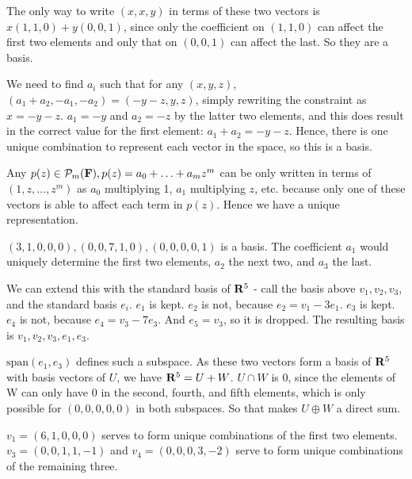 \documentclass{article}
\begin{document}

The only way to write $(x,x,y)$ in terms of these two vectors is $x(1,1,0) +
y(0,0,1)$, since only the coefficient on $(1,1,0)$ can affect the first two
elements and only that on $(0,0,1)$ can affect the last. So they are a basis.


We need to find $a_i$ such that for any $(x, y, z)$, $(a_1 + a_2, -a_1, -a_2) =
(-y-z, y, z)$, simply rewriting the constraint as $x = -y - z$. $a_1 = -y$ and
$a_2 = -z$ by the latter two elements, and this does result in the correct value
for the first element: $a_1 + a_2 = -y - z$. Hence, there is one unique
combination to represent each vector in the space, so this is a basis.


Any $p(z) \in \mathcal{P}_m(\mathbf{F}), p(z) = a_0 + \ldots + a_mz^m$ can be only
written in terms of $(1, z, \ldots, z^m)$ as $a_0$ multiplying 1, $a_1$
multiplying $z$, etc. because only one of these vectors is able to affect each
term in $p(z)$. Hence we have a unique representation.


$(3,1,0,0,0), (0,0,7,1,0), (0,0,0,0,1)$ is a basis. The coefficient $a_1$ would
uniquely determine the first two elements, $a_2$ the next two, and $a_3$ the
last.


We can extend this with the standard basis of $\mathbf{R}^5$ - call the basis above
$v_1, v_2, v_3$, and the standard basis $e_i$. $e_1$ is kept. $e_2$ is not,
because $e_2 = v_1 - 3e_1$. $e_3$ is kept. $e_4$ is not, because $e_4 = v_3 -
7e_3$. And $e_5 = v_3$, so it is dropped. The resulting basis is $v_1, v_2, v_3,
e_1, e_3$.


$\text{span}(e_1, e_3)$ defines such a subspace. As these two vectors form a
basis of $\mathbf{R}^5$ with basis vectors of $U$, we have $\mathbf{R}^5 = U + W$. $U
\cap W$ is 0, since the elements of W can only have 0 in the second, fourth,
and fifth elements, which is only possible for $(0,0,0,0,0)$ in both subspaces.
So that makes $U \oplus W$ a direct sum.


$v_1 = (6,1,0,0,0)$ serves to form unique combinations of the first two
elements. $v_3 = (0,0,1,1,-1)$ and $v_4 = (0,0,0,3,-2)$ serve to form unique
combinations of the remaining three.

\end{document}
